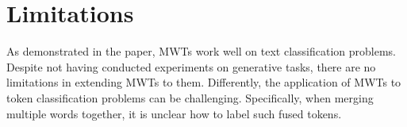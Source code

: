 \documentclass[11pt]{article}
\begin{document}
\section{Limitations}
As demonstrated in the paper, MWTs work well on text classification problems. Despite not having conducted experiments on generative tasks, there are no limitations in extending MWTs to them. Differently, the application of MWTs to token classification problems can be challenging. Specifically, when merging multiple words together, it is unclear how to label such fused tokens.




\end{document}
